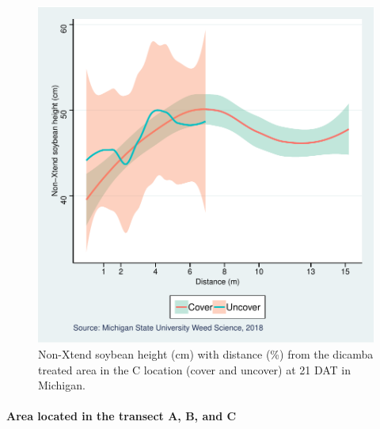 \documentclass[]{article}
\let\oldparagraph\paragraph
\renewcommand{\paragraph}[1]{\oldparagraph{#1}\mbox{}}
\begin{document}
\begin{figure}
\centering
\includegraphics{Report_Dicamba_study_files/figure-latex/unnamed-chunk-59-1.pdf}
\caption{Non-Xtend soybean height (cm) with distance (\%) from the
dicamba treated area in the C location (cover and uncover) at 21 DAT in
Michigan.}
\end{figure}

\newpgae
\pagebreak

\paragraph{\texorpdfstring{Area located in the \textbf{transect} A, B,
and
C}{Area located in the transect A, B, and C}}\label{area-located-in-the-transect-a-b-and-c-1}
\end{document}
